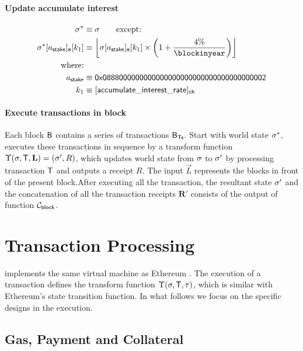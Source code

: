 \paragraph{Update accumulate interest}
\begin{align}
	\st^{*}&\eqdef \st \qquad \mbox{except:} \\ 
	\st^{*}[a_{\sf stake}]_{\bf s}[k_1] & \eqdef \left\lfloor\st[a_{\sf stake}]_{\bf s}[k_1] \times \left(1+\frac{4\%}{\blockinyear}\right)\right\rfloor\\
	\mbox{where:}& \\ 
	a_{\sf stake} & \eqdef \stakingcontract \\ 
	k_1 & \eqdef [{\sf accumulate\char`_interest\char`_rate}]_{\sf ch}
\end{align}

\paragraph{Execute transactions in block}

Each block $\textsf{B}$ contains a series of transactions $\textsf{B}_{\sf Ts}$. Start with world state $\mathbf{\sigma}^{*}$, \name executes these transactions in sequence by a transform function $\Upsilon(\mathbf{\sigma},\textsf{T},\mathbf{L})=(\mathbf{\sigma}',R)$, which updates world state from $\mathbf{\sigma}$ to $\mathbf{\sigma}'$ by processing transaction $\textsf{T}$ and outputs a receipt $R$. The input $\vec{L}$ represents the blocks in front of the present block.After executing all the transaction, the resultant state $\mathbf{\sigma}'$ and the concatenation of all the transaction receipts $\mathbf{R}'$ consists of the output of function $\mathcal{C}_{\sf block}$.

\section{Transaction Processing}
\label{sec:tx_processing}

\name implements the same virtual machine as Ethereum \cite{ETH_yellow}. 
The execution of a transaction defines the transform function $\Upsilon(\mathbf{\sigma},\textsf{T},\tau)$, which is similar with Ethereum's state transition function.
In what follows we focus on the \name specific designs in the execution.

\subsection{Gas, Payment and Collateral}
\label{subsec:gas_and_pay}

